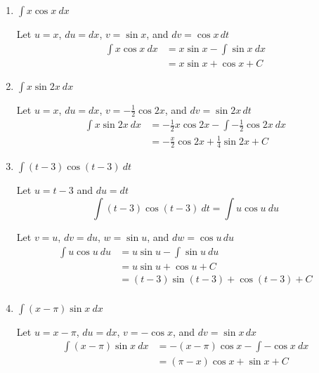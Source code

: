 \documentclass[12pt]{article}
\begin{document}
\begin{enumerate}
\item $\displaystyle\int x \cos x \ dx$

Let $u=x$, $du=dx$, $v=\sin x$, and $dv =\cos x\,dt$
\begin{equation*}
\begin{aligned}
\int x \cos x \ dx &= x\sin x - \int \sin x \ dx \\
&= x \sin x + \cos x + C
\end{aligned}
\end{equation*}

\item $\displaystyle\int x \sin 2x \ dx$

Let $u=x$, $du=dx$, $v=-\frac{1}{2}\cos 2x$, and $dv =\sin 2x\,dt$
\begin{equation*}
\begin{aligned}
\int x \sin 2x \ dx &= -\frac{1}{2}x\cos 2x - \int -\frac{1}{2}\cos 2x \ dx \\
&= -\frac{x}{2}\cos 2x + \frac{1}{4} \sin 2x + C
\end{aligned}
\end{equation*}

\item $\displaystyle\int (t-3) \cos (t-3) \ dt$

Let $u = t-3$ and $du = dt$
$$\int (t-3) \cos (t-3) \ dt = \int u \cos u \ du $$

Let $v=u$, $dv=du$, $w=\sin u$, and $dw =\cos u\,du$
\begin{equation*}
\begin{aligned}
\int u \cos u \ du &= u\sin u - \int \sin u \ du \\
&= u \sin u + \cos u + C \\
&= (t-3) \sin (t-3) + \cos (t-3) + C \\
\end{aligned}
\end{equation*}

\item $\displaystyle\int (x-\pi) \sin x \ dx$

Let $u=x-\pi$, $du=dx$, $v=-\cos x$, and $dv =\sin x\,dx$
\begin{equation*}
\begin{aligned}
\int (x-\pi) \sin x \ dx &= -(x-\pi)\cos x - \int -\cos x \ dx \\
&= (\pi-x)\cos x + \sin x + C \\
\end{aligned}
\end{equation*}


\end{enumerate}
\end{document}
